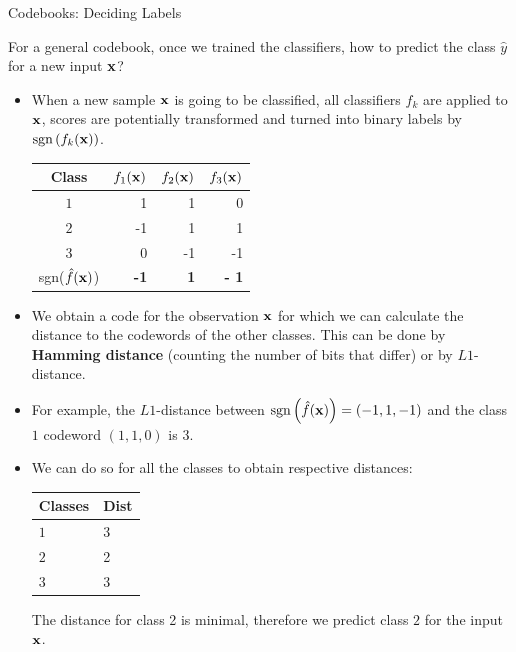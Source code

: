 \documentclass[11pt,compress,t,notes=noshow, xcolor=table]{beamer}
\begin{document}
\begin{vbframe}{Codebooks: Deciding Labels}


For a general codebook, once we trained the classifiers, how to predict the class $\hat y$ for a new input $\mathbf{x}$?

\begin{itemize}
\item When a new sample $\mathbf{x}$ is going to be classified, all classifiers $f_k$ are applied to $\mathbf{x}$, scores are potentially transformed and turned into binary labels by $\text{sgn}\left(f_k(\mathbf{x})\right)$. 

\begin{table}[]
\footnotesize
\begin{tabular}{|c|r|r|r|} \hline
\textbf{Class}  & \textbf{$f_1{(\mathbf{x})}$} & \textbf{$f_2{(\mathbf{x})}$}  & \textbf{$f_3{(\mathbf{x})}$} \\ \hline
\textbf{$1$}              &   1                 & 1                   & 0                   \\ \hline
\textbf{$2$}              &  -1                 &  1                   & 1                   \\ \hline
\textbf{$3$}              &  0                 & -1                   &  -1                   \\ \hline
{sgn($\hat{f}(\mathbf{x})$)}    & \textbf{-1}         &  \textbf{1}          &  \textbf{- 1}          \\ \hline
\end{tabular}
\end{table}

\item We obtain a code for the observation $\mathbf{x}$ for which we can calculate the distance to the codewords of the other classes. This can be done by \textbf{Hamming distance} (counting the number of bits that differ) or by $L1$-distance.
\item For example, the $L1$-distance between $\text{sgn}\left(\hat f(\mathbf{x})\right) = \left(- 1, 1, -1\right)$ and the class $1$ codeword $\left(1, 1, 0\right)$ is $3$.
\item We can do so for all the classes to obtain respective distances: 

\begin{table}[]
\footnotesize
\begin{tabular}{|l|l|} \hline
\textbf{Classes}    & Dist \\ \hline
\textbf{$1$}        &   3       \\ \hline 
\textbf{$2$}        &   2       \\ \hline 
\textbf{$3$}        &   3       \\ \hline          
\end{tabular}
\end{table}

The distance for class 2 is minimal, therefore we predict class $2$ for the input $\mathbf{x}$. 
\end{itemize}

\end{vbframe}
\end{document}
